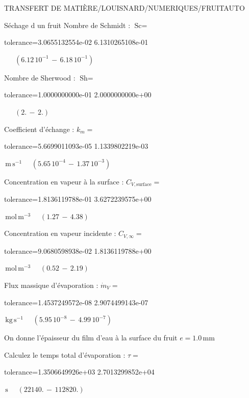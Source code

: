 \documentclass[12pt]{article}
\begin{document}
\begin{quiz}{TRANSFERT DE MATIÈRE/LOUISNARD/NUMERIQUES/FRUITAUTO}
\begin{cloze}{Séchage d un fruit}
Nombre de Schmidt : $\text{Sc} =  $
\begin{numerical}[points=1] 
\item[tolerance={3.0655132554e-02}] 6.1310265108e-01 
\end{numerical} 
 $\,$ 
 $ \quad ( 6.12 \, 10^{-1}  \, - \,  6.18 \, 10^{-1} ) $ 

Nombre de Sherwood : $\text{Sh} =  $
\begin{numerical}[points=2] 
\item[tolerance={1.0000000000e-01}] 2.0000000000e+00 
\end{numerical} 
 $\,$ 
 $ \quad (2. \, - \, 2.) $ 

Coefficient d'échange : $k_m =  $
\begin{numerical}[points=1] 
\item[tolerance={5.6699011093e-05}] 1.1339802219e-03 
\end{numerical} 
 $\,  \mathrm{m}\,  \mathrm{s}^{-1}$ 
 $ \quad ( 5.65 \, 10^{-4}  \, - \,  1.37 \, 10^{-3} ) $ 

Concentration en vapeur à la surface : $C_{V, \text{surface}} =  $
\begin{numerical}[points=2] 
\item[tolerance={1.8136119788e-01}] 3.6272239575e+00 
\end{numerical} 
 $\,  \mathrm{mol}\,  \mathrm{m}^{-3}$ 
 $ \quad (1.27 \, - \, 4.38) $ 

Concentration en vapeur incidente : $C_{V, \infty} =  $
\begin{numerical}[points=2] 
\item[tolerance={9.0680598938e-02}] 1.8136119788e+00 
\end{numerical} 
 $\,  \mathrm{mol}\,  \mathrm{m}^{-3}$ 
 $ \quad (0.52 \, - \, 2.19) $ 

Flux massique d'évaporation : $\dot{m}_V =  $
\begin{numerical}[points=1] 
\item[tolerance={1.4537249572e-08}] 2.9074499143e-07 
\end{numerical} 
 $\,  \mathrm{kg}\,  \mathrm{s}^{-1}$ 
 $ \quad ( 5.95 \, 10^{-8}  \, - \,  4.99 \, 10^{-7} ) $ 

 

On donne l'épaisseur du film d'eau à la surface du fruit $e = 1.0\,  \mathrm{mm} $

Calculez le temps total d'évaporation : $\tau =  $
\begin{numerical}[points=2] 
\item[tolerance={1.3506649926e+03}] 2.7013299852e+04 
\end{numerical} 
 $\,  \mathrm{s}$ 
 $ \quad (22140. \, - \, 112820.) $ 


\end{cloze}
\end{quiz}
\end{document}
